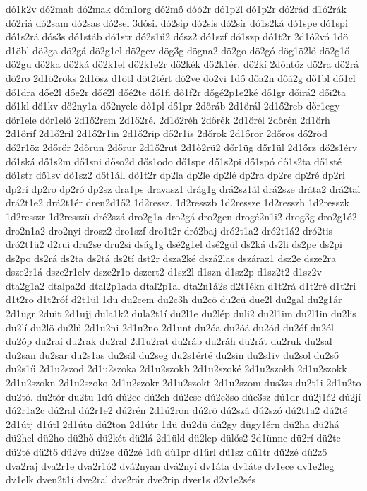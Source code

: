 {dó1k2v
dó2mab
dó2mak
dóm1org
dó2mő
dóó2r
dó1p2l
dó1p2r
dó2rád
d1ó2rák
dó2riá
dó2sam
dó2sas
dó2sel
3dósi.
dó2sip
dó2sis
dó2sír
dó1s2ká
dó1spe
dó1spi
dó1s2rá
dós3s
dó1stáb
dó1str
dó2s1ű2
dósz2
dó1szf
dó1szp
dó1t2r
2d1ó2vó
1dö
d1öbl
dö2ga
dö2gá
dö2g1el
dö2gev
dög3g
dögna2
dö2go
dö2gó
dög1ö2lő
dö2g1ő
dö2gu
dö2ka
dö2ká
dö2k1el
dö2k1e2r
dö2kék
dö2k1ér.
dö2kí
2döntöz
dö2ra
dö2rá
dö2ro
2d1ö2röks
2d1ösz
d1ötl
döt2tért
dö2ve
dö2vi
1dő
dőa2n
dőá2g
dő1bl
dő1cl
dő1dra
dőe2l
dőe2r
dőé2l
dőé2te
dő1fl
dő1f2r
dőgé2p1e2ké
dő1gr
dőirá2
dői2ta
dő1kl
dő1kv
dő2ny1a
dő2nyele
dő1pl
dő1pr
2dőráb
2d1őrál
2d1ő2reb
dőr1egy
dőr1ele
dőr1elő
2d1ő2rem
2d1ő2ré.
2d1ő2réh
2dőrék
2d1őrél
2dőrén
2d1őrh
2d1őrif
2d1ő2ril
2d1ő2r1in
2d1ő2rip
dő2r1is
2dőrok
2d1őror
2dőros
dő2röd
dő2r1öz
2dőrőr
2dőrun
2dőrur
2d1ő2rut
2d1ő2rü2
dőr1üg
dőr1ül
2d1őrz
dő2s1érv
dő1ská
dő1s2m
dő1sni
dőso2d
dős1odo
dő1spe
dő1s2pi
dő1spó
dő1s2ta
dő1sté
dő1str
dő1sv
dő1sz2
dőt1áll
dő1t2r
dp2la
dp2le
dp2lé
dp2ra
dp2re
dp2ré
dp2ri
dp2rí
dp2ro
dp2ró
dp2sz
dra1ps
dravasz1
drág1g
drá2sz1ál
drá2sze
dráta2
drá2tal
drá2t1e2
drá2t1ér
dren2d1ő2
1d2ressz.
1d2resszb
1d2ressze
1d2resszh
1d2resszk
1d2resszr
1d2resszü
dré2szá
dro2g1a
dro2gá
dro2gen
drogé2n1i2
drog3g
dro2g1ó2
dro2n1a2
dro2nyi
drosz2
dro1szf
dro1t2r
dró2baj
dró2t1a2
dró2t1á2
dró2tis
dró2t1ü2
d2rui
dru2se
dru2si
dság1g
dsé2g1el
dsé2gül
ds2ká
ds2li
ds2pe
ds2pi
ds2po
ds2rá
ds2ta
ds2tá
ds2tí
dst2r
dsza2ké
dszá2las
dszáraz1
dsz2e
dsze2ra
dsze2r1á
dsze2r1elv
dsze2r1o
dszert2
d1sz2l
d1szn
d1sz2p
d1sz2t2
d1sz2v
dta2g1a2
dtalpa2d
dtal2p1ada
dtal2p1al
dta2n1á2s
d2t1ékn
d1t2rá
d1t2ré
d1t2ri
d1t2ro
d1t2róf
d2t1ül
1du
du2cem
du2c3h
du2cö
du2cü
due2l
du2gal
du2g1ár
2d1ugr
2duit
2d1ujj
dula1k2
dula2t1í
du2l1e
du2lép
duli2
du2l1im
du2l1in
du2lis
du2lí
du2lö
du2lű
2d1u2ni
2d1u2no
2d1unt
du2óa
du2óá
du2ód
du2óf
du2ól
du2óp
du2rai
du2rak
du2ral
2d1u2rat
du2ráb
du2ráh
du2rát
du2ruk
du2sal
du2san
du2sar
du2s1as
du2sál
du2seg
du2s1érté
du2sin
du2s1iv
du2sol
du2ső
du2s1ű
2d1u2szod
2d1u2szoka
2d1u2szokb
2d1u2szoké
2d1u2szokh
2d1u2szokk
2d1u2szokn
2d1u2szoko
2d1u2szokr
2d1u2szokt
2d1u2szom
dus3zs
du2t1i
2d1u2to
du2tó.
du2tór
du2tu
1dú
dú2ce
dú2ch
dú2cse
dú2c3so
dúc3sz
dú1dr
dú2j1é2
dú2jí
dú2r1a2c
dú2ral
dú2r1e2
dú2rén
2d1ú2ron
dú2rö
dú2szá
dú2szó
dú2t1a2
dú2té
2d1útj
d1útl
2d1útn
dú2ton
2d1útr
1dü
dü2dü
dü2gy
dügy1érn
dü2ha
dü2há
dü2hel
dü2ho
dü2hő
dü2két
dü2lá
2d1üld
dü2lep
dülős2
2d1ünne
dü2rí
dü2te
dü2té
dü2tő
dü2ve
dü2ze
dü2zé
1dű
dű1pr
d1űrl
dű1sz
dű1tr
dű2zé
dű2ző
dva2raj
dva2r1e
dva2r1ó2
dvá2nyan
dvá2nyí
dv1áta
dv1áte
dv1ece
dv1e2leg
dv1elk
dven2t1í
dve2ral
dve2rár
dve2rip
dver1s
d2v1e2sés
}
